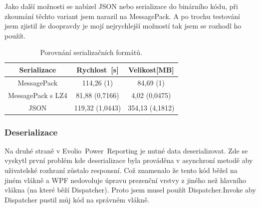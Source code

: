 \documentclass[czech,bachelorpractice,dept460,male,csharp]{diploma}
\newcommand{\EFilters}{Evolio~Power~Reporting}
\begin{document}
			Jako další možnosti se nabízel JSON nebo serializace do binárního kódu, při zkoumání těchto variant jsem narazil na MessagePack. A po trochu testování jsem zjistil že doopravdy je mojí nejrychlejší možností tak jsem se rozhodl ho použít.
			\begin{table}[h!]
				\centering
				\begin{tabular}{|c|c|c|} 
 					\hline
 					Serializace & Rychlost\footnotemark\ [s] & Velikost[MB] \\\hline\hline
 					MessagePack & 114,26 (1)\footnotemark & 84,69 (1)\footnotemark[\value{footnote}] 	\\\hline
 					MessagePack s LZ4 & 81,88 (0,7166)\footnotemark[\value{footnote}] & 4,02 (0,0475)\footnotemark[\value{footnote}]   \\\hline
 					JSON & 119,32 (1,0443)\footnotemark[\value{footnote}]  & 354,13 (4,1812)\footnotemark[\value{footnote}] 	\\\hline
				\end{tabular}
				
				\caption{Porovnání serializačních formátů.}
				\label{table:serilization}
			\end{table}
		\subsubsection{Deserializace}
			 Na druhé straně v {\EFilters} je nutné data deserializovat. Zde se vyskytl první problém kde deserializace byla prováděna v asynchroní metodě aby uživatelské rozhraní zůstalo responsní. Což znamenalo že tento kód běžel na jiném vlákně a WPF nedovoluje úpravu prezenční vrstvy z jiného než hlavního vlákna (na které běží Dispatcher). Proto jsem musel použít Dispatcher.Invoke aby Dispatcher pustil můj kód na správném vlákně.

			 
\end{document}
